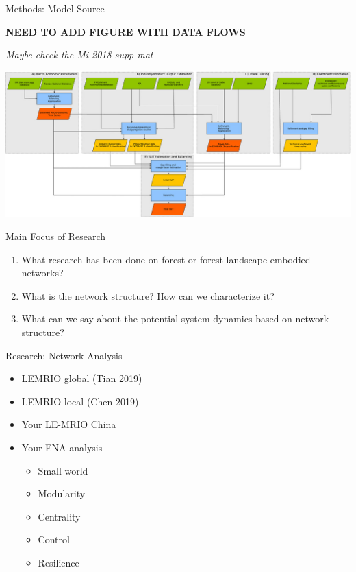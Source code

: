 \documentclass{beamer}
\begin{document}
\begin{frame}{Methods: Model Source}

\textbf{NEED TO ADD FIGURE WITH DATA FLOWS}

\emph{Maybe check the Mi 2018 supp mat}

\begin{center}\includegraphics[width=0.5\linewidth]{images/exiobase3} \end{center}

\end{frame}

\begin{frame}{Main Focus of Research}

\begin{enumerate}
\item
  What research has been done on forest or forest landscape embodied
  networks?
\item
  What is the network structure? How can we characterize it?
\item
  What can we say about the potential system dynamics based on network
  structure?
\end{enumerate}

\end{frame}

\begin{frame}{Research: Network Analysis}

\begin{itemize}
\item
  LEMRIO global (Tian 2019)
\item
  LEMRIO local (Chen 2019)
\item
  Your LE-MRIO China
\item
  Your ENA analysis

  \begin{itemize}
  \item
    Small world
  \item
    Modularity
  \item
    Centrality
  \item
    Control
  \item
    Resilience
  \end{itemize}
\end{itemize}

\end{frame}
\end{document}
